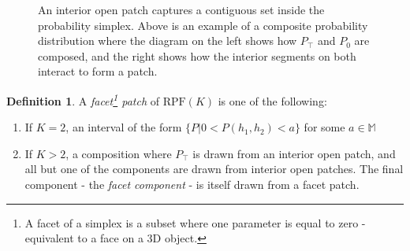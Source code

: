 \documentclass[twoside]{article}
\theoremstyle{plain}%
\theoremstyle{definition}
\newtheorem{definition}{Definition}[section]
\theoremstyle{remark}
\begin{document}
\begin{appendices}
\begin{figure}[h]
{
}
\caption{An interior open patch captures a contiguous set inside the probability simplex. Above is an example of a composite probability distribution where the diagram on the left shows how \(P_\top\) and \(P_0\) are composed, and the right shows how the interior segments on both interact to form a patch. }
\label{fig:interior_open_patch}
\end{figure}

\begin{definition}
A \textit{facet\footnote{A facet of a simplex is a subset where one parameter is equal to zero - equivalent to a face on a 3D object.} patch} of \(\text{RPF}(K)\) is one of the following:

\begin{enumerate}
  \item If \(K = 2\), an interval of the form \(\{P | 0 < P(h_1, h_2) < a\}\) for some \(a \in \mathbb{M}\) 
  \item If \(K > 2\), a composition where \(P_{\top}\) is drawn from an interior open patch, and all but one of the components are drawn from interior open patches. The final component - the \textit{facet component} - is itself drawn from a facet patch.
\end{enumerate}
\end{definition}


\end{appendices}
\end{document}
